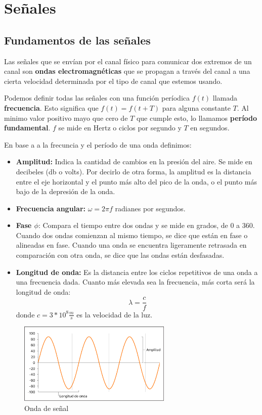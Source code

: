 \section{Señales}
\subsection{Fundamentos de las señales}
Las señales que se envían por el canal físico para comunicar dos extremos de un canal son \textbf{ondas electromagnéticas} que se propagan a través del canal a una cierta velocidad determinada por el tipo de canal que estemos usando.


Podemos definir todas las señales con una función períodica \(f(t)\) llamada \textbf{frecuencia}. Esto significa que \(f(t) = f(t + T)\) para alguna constante \(T\). Al minimo valor positivo mayo que cero de \(T\) que cumple esto, lo llamamos \textbf{período fundamental}. \(f\) se mide en Hertz o ciclos por segundo y \(T\) en segundos. 

En base a a la frecuncia y el período de una onda definimos:

\begin{itemize}
  \item \textbf{Amplitud:} Indica la cantidad de cambios en la presión del aire. Se mide en decibeles (db o volts). Por decirlo de otra forma, la amplitud es la distancia entre el eje horizontal y el punto más alto del pico de la onda, o el punto más bajo de la depresión de la onda.
  \item \textbf{Frecuencia angular:} \(\omega = 2\pi f\) radianes por segundos.
  \item \textbf{Fase \(\phi\)}: Compara el tiempo entre dos ondas y se mide en grados, de 0 a 360. Cuando dos ondas comienzan al mismo tiempo, se dice que están en fase o alineadas en fase. Cuando una onda se encuentra ligeramente retrasada en comparación con otra onda, se dice que las ondas están desfasadas.
  \item \textbf{Longitud de onda:} Es la distancia entre los ciclos repetitivos de una onda a una frecuencia dada. Cuanto más elevada sea la frecuencia, más corta será la longitud de onda: \[\lambda = \frac{c}{f}\]
  donde \(c=3*10^8\frac{m}{s}\) es la velocidad de la luz.
\end{itemize}
\begin{figure}[H]
	\centering
	\includegraphics[width=0.65\textwidth
]{images/amplitud.png}
	\caption[Onda de señal]{Onda de señal}
	\label{fig:sistema-comunicacion-real}
\end{figure}

